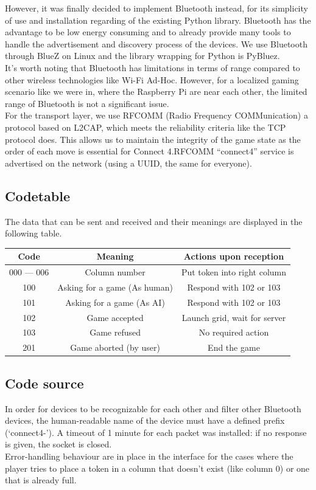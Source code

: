 \documentclass[11pt, a4paper, oneside]{report}
\begin{document}
	However, it was finally decided to implement Bluetooth instead, for its simplicity of use and installation regarding of the existing Python library. Bluetooth has the advantage to be low energy consuming and to already provide many tools to handle the advertisement and discovery process of the devices. We use Bluetooth through BlueZ on Linux and the library wrapping for Python is PyBluez. \\
	
	It's worth noting that Bluetooth has limitations in terms of range compared to other wireless technologies like Wi-Fi Ad-Hoc. However, for a localized gaming scenario like we were in, where the Raspberry Pi are near each other, the limited range of Bluetooth is not a significant issue. \\

	For the transport layer, we use RFCOMM (Radio Frequency COMMunication) a protocol based on L2CAP, which meets the reliability criteria like the TCP protocol does. This allows us to maintain the integrity of the game state as the order of each move is essential for Connect 4.\@ RFCOMM “connect4” service is advertised on the network (using a UUID, the same for everyone).

	\subsection{Codetable}
	The data that can be sent and received and their meanings are displayed in the following table.
	\begin{tabular}{ |c|c|c| }
		\toprule
		Code & Meaning & Actions upon reception \\
		\midrule
		000 — 006 & Column number & Put token into right column \\
		100 & Asking for a game (As human) & Respond with 102 or 103 \\
		101 & Asking for a game (As AI) & Respond with 102 or 103 \\
		102 & Game accepted & Launch grid, wait for server \\
		103 & Game refused & No required action \\
		201 & Game aborted (by user) & End the game \\
		\bottomrule
	  \end{tabular}

	\subsection{Code source}
	In order for devices to be recognizable for each other and filter other Bluetooth devices, the human-readable name of the device must have a defined prefix (`connect4-'). A timeout of 1 minute for each packet was installed: if no response is given, the socket is closed. \\
	Error-handling behaviour are in place in the interface for the cases where the player tries to place a token in a column that doesn’t exist (like column 0) or one that is already full. \\
\end{document}
